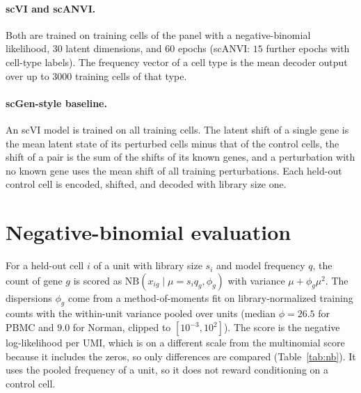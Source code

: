 \paragraph{scVI and scANVI.}
Both are trained on training cells of the panel with a negative-binomial likelihood, $30$ latent dimensions, and $60$ epochs (scANVI: $15$ further epochs with cell-type labels).
The frequency vector of a cell type is the mean decoder output over up to $3000$ training cells of that type.

\paragraph{scGen-style baseline.}
An scVI model is trained on all training cells.
The latent shift of a single gene is the mean latent state of its perturbed cells minus that of the control cells, the shift of a pair is the sum of the shifts of its known genes, and a perturbation with no known gene uses the mean shift of all training perturbations.
Each held-out control cell is encoded, shifted, and decoded with library size one.

\FloatBarrier
\section{Negative-binomial evaluation}\label{app:nb}
For a held-out cell $i$ of a unit with library size $s_i$ and model frequency $q$, the count of gene $g$ is scored as $\mathrm{NB}(x_{ig}\mid\mu=s_iq_g,\phi_g)$ with variance $\mu+\phi_g\mu^2$.
The dispersions $\phi_g$ come from a method-of-moments fit on library-normalized training counts with the within-unit variance pooled over units (median $\phi=26.5$ for PBMC and $9.0$ for Norman, clipped to $[10^{-3},10^2]$).
The score is the negative log-likelihood per UMI, which is on a different scale from the multinomial score because it includes the zeros, so only differences are compared (Table~\ref{tab:nb}).
It uses the pooled frequency of a unit, so it does not reward conditioning on a control cell.


